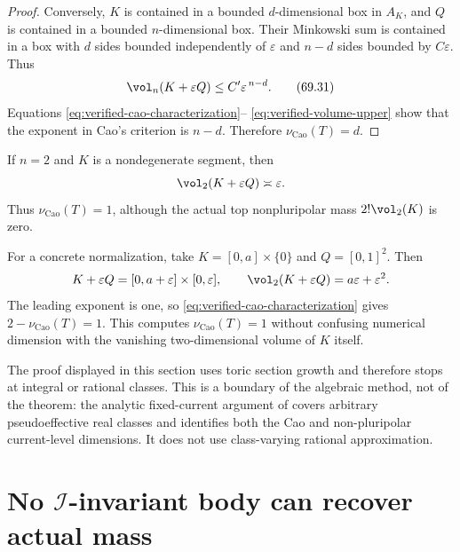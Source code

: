 \begin{proof}
Conversely, \(K\) is contained in a bounded \(d\)-dimensional box in
\(A_K\), and \(Q\) is contained in a bounded \(n\)-dimensional box.
Their Minkowski sum is contained in a box with \(d\) sides bounded
independently of \(\varepsilon\) and \(n-d\) sides bounded by
\(C\varepsilon\). Thus
\[
                \vol_n(K+\varepsilon Q)
                       \leq C'\varepsilon^{\,n-d}.
\tag{69.31}\label{eq:verified-volume-upper}
\]
Equations \eqref{eq:verified-cao-characterization}--
\eqref{eq:verified-volume-upper} show that the exponent in Cao's
criterion is \(n-d\). Therefore
\(\nu_{\mathrm{Cao}}(T)=d\).
\end{proof}

\begin{example}
\label{ex:verified-toric-segment}
If $n=2$ and $K$ is a nondegenerate segment, then
\[
              \vol_2(K+\varepsilon Q)\asymp\varepsilon.
\]
Thus $\nu_{\mathrm{Cao}}(T)=1$, although the actual top
nonpluripolar mass $2!\vol_2(K)$ is zero.

For a concrete normalization, take
$K=[0,a]\times\{0\}$ and $Q=[0,1]^2$. Then
\[
             K+\varepsilon Q=[0,a+\varepsilon]\times[0,\varepsilon],
 \qquad
             \vol_2(K+\varepsilon Q)=a\varepsilon+\varepsilon^2.
\]
The leading exponent is one, so
\eqref{eq:verified-cao-characterization} gives
$2-\nu_{\mathrm{Cao}}(T)=1$. This computes
$\nu_{\mathrm{Cao}}(T)=1$ without confusing numerical dimension with the
vanishing two-dimensional volume of $K$ itself.
\end{example}

\begin{remark}
\label{rem:verified-toric-rationality}
The proof displayed in this section uses toric section growth and therefore
stops at integral or rational classes.  This is a boundary of the algebraic
method, not of the theorem: the analytic fixed-current argument of
 covers arbitrary pseudoeffective real
classes and identifies both the Cao and non-pluripolar current-level
dimensions.  It does not use class-varying rational approximation.
\end{remark}

\section{No \texorpdfstring{$\mathcal I$}{I}-invariant body can recover actual mass}
\label{sec:verified-mass-no-go}

